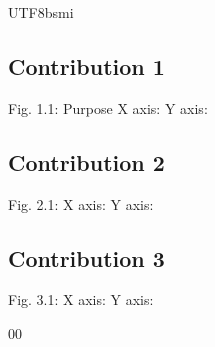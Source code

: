 \documentclass[conference]{IEEEtran}
\begin{document}
\begin{CJK}{UTF8}{bsmi}
\subsection{Contribution 1}
Fig. 1.1: Purpose
    X axis: 
    Y axis:
\subsection{Contribution 2}
Fig. 2.1: 
    X axis: 
    Y axis:
\subsection{Contribution 3}
Fig. 3.1: 
    X axis: 
    Y axis:
\begin{thebibliography}{00}
\end{thebibliography}
\end{CJK}\
\end{document}
